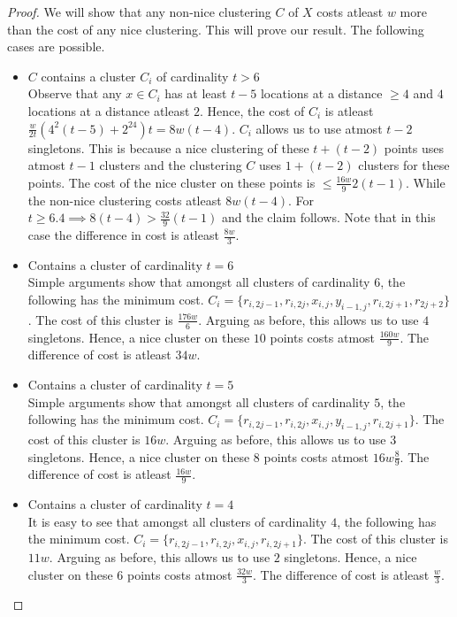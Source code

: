 \documentclass{article}
\begin{document}
\begin{proof}
We will show that any non-nice clustering $C$ of $X$ costs atleast $w$ more than the cost of any nice clustering. This will prove our result. The following cases are possible.

\begin{itemize}[nolistsep,leftmargin=*]
\item $C$ contains a cluster $C_i$ of cardinality $t > 6$\\
Observe that any $x \in C_i$ has at least $t-5$ locations at a distance $\ge 4$ and $4$ locations at a distance atleast $2$. Hence, the cost of $C_i$ is atleast $\frac{w}{2t}(4^2(t-5)+2^24)t = 8w(t-4)$. $C_i$ allows us to use atmost $t-2$ singletons. This is because a nice clustering of these $t+(t-2)$ points uses atmost $t-1$ clusters and the clustering $C$ uses  $1 + (t-2)$ clusters for these points. The cost of the nice cluster on these points is $\le \frac{16w}{9}2(t-1)$. While the non-nice clustering costs atleast $8w(t-4)$. For $t \ge 6.4 \implies 8(t-4) > \frac{32}{9}(t-1)$ and the claim follows. Note that in this case the difference in cost is atleast $\frac{8w}{3}$. 

\item Contains a cluster of cardinality $t = 6$\\
Simple arguments show that amongst all clusters of cardinality $6$, the following has the minimum cost. $C_i = \{r_{i, 2j-1}, r_{i, 2j}, x_{i,j}, y_{i-1, j}, r_{i, 2j+1}, r_{2j+2}\}$. The cost of this cluster is $\frac{176w}{6}$. Arguing as before, this allows us to use $4$ singletons. Hence, a nice cluster on these $10$ points costs atmost $\frac{160w}{9}$. The difference of cost is atleast $34w$.  

\item Contains a cluster of cardinality $t = 5$\\
Simple arguments show that amongst all clusters of cardinality $5$, the following has the minimum cost. $C_i = \{r_{i, 2j-1}, r_{i, 2j}, x_{i,j}, y_{i-1, j}, r_{i, 2j+1}\}$. The cost of this cluster is $16w$. Arguing as before, this allows us to use $3$ singletons. Hence, a nice cluster on these $8$ points costs atmost $16w\frac{8}{9}$. The difference of cost is atleast $\frac{16w}{9}$.  

\item Contains a cluster of cardinality $t = 4$\\
It is easy to see that amongst all clusters of cardinality $4$, the following has the minimum cost. $C_i = \{r_{i, 2j-1}, r_{i, 2j}, x_{i,j}, r_{i, 2j+1}\}$. The cost of this cluster is $11w$. Arguing as before, this allows us to use $2$ singletons. Hence, a nice cluster on these $6$ points costs atmost $\frac{32w}{3}$. The difference of cost is atleast $\frac{w}{3}$.


\end{itemize}
\end{proof}
\end{document}
